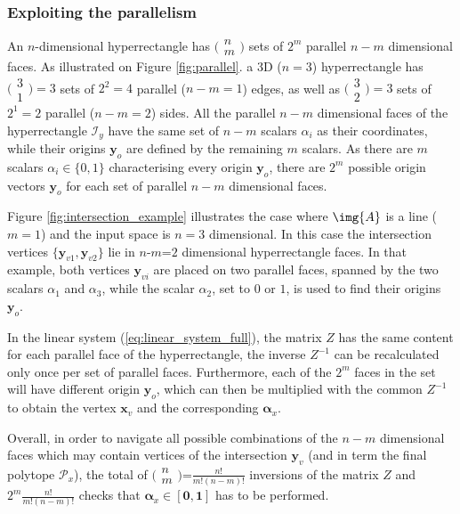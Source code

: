\subsubsection{Exploiting the parallelism} An $n$-dimensional hyperrectangle has $\big(\begin{smallmatrix}n\\m\end{smallmatrix}\big)$ sets of $2^m$ parallel $n\!-\!m$ dimensional faces. As illustrated on Figure \ref{fig:parallel}. a 3D ($n\!=\!3$) hyperrectangle has $\big(\begin{smallmatrix}3\\1\end{smallmatrix}\big)\!=\!3$ sets of $2^{2}\!=\!4$ parallel ($n\!-\!m\!=\!1$) edges, as well as $\big(\begin{smallmatrix}3\\2\end{smallmatrix}\big)=3$ sets of $2^1\!=\!2$ parallel ($n\!-\!m\!=\!2$) sides. 
All the parallel $n\!-\!m$ dimensional faces of the hyperrectangle $\mathcal{I}_y$ have the same set of $n\!-\!m$ scalars $\alpha_i$ as their coordinates, while their origins $\bm{y}_o$ are defined by the remaining $m$ scalars. As there are $m$ scalars $\alpha_i\in\{0,1\}$ characterising every origin $\bm{y}_o$, there are $2^m$ possible origin vectors $\bm{y}_o$ for each set of parallel $n\!-\!m$ dimensional faces. 

Figure \ref{fig:intersection_example} illustrates the case where $\img{A}$ is a line ($m=1$) and the input space is $n=3$ dimensional. In this case the intersection vertices $\{\bm{y}_{v1},\bm{y}_{v2}\}$ lie in $n$-$m$=$2$ dimensional hyperrectangle faces. In that example, both vertices $\bm{y}_{vi}$ are placed on two parallel faces, spanned by the two scalars $\alpha_1$ and $\alpha_3$, while the scalar $\alpha_2$, set to $0$ or $1$, is used to find their origins $\bm{y}_o$.

In the linear system  (\ref{eq:linear_system_full}), the matrix $Z$ has the same content for each parallel face of the hyperrectangle, the inverse $Z^{-1}$ can be recalculated only once per  set of parallel faces. Furthermore, each of the $2^m$ faces in the set will have different origin $\bm{y}_o$, which can then be multiplied with the common $Z^{-1}$ to obtain the vertex $\bm{x}_{v}$ and the corresponding $\bm{\alpha}_x$. 


Overall, in order to navigate all possible combinations of the $n\!-\!m$ dimensional faces which may contain vertices of the intersection $\bm{y}_v$ (and in term the final polytope $\mathcal{P}_x$), the total of $\big(\begin{smallmatrix}n\\m\end{smallmatrix}\big)$=$\frac{n!}{m!(n-m)!}$ inversions of the matrix $Z$ and  $2^m \frac{n!}{m!(n-m)!}$ checks that $\bm{\alpha}_x \in [\bm{0},\bm{1}]$ has to be performed.

